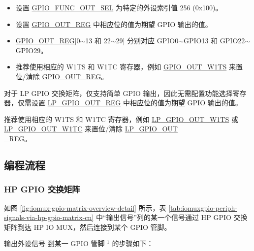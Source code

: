 \documentclass[main\_\_CN.tex]{subfiles}
\begin{document}
\begin{itemize}
    \item 设置 \hyperref[fielddesc:GPIOFUNCNOUTSEL]{GPIO\_FUNC\_OUT\_SEL} 为特定的外设索引值 256 (0x100)。
    \item 设置 \hyperref[regdesc:GPIOOUTREG]{GPIO\_OUT\_REG} 中相应位的值为期望 GPIO 输出的值。
\end{itemize}
\begin{tiplisting}
\vspace{-2em}
\begin{itemize}

\item \hyperref[regdesc:GPIOOUTREG]{GPIO\_OUT\_REG}[0$\sim$13 和 22$\sim$29] 分别对应 GPIO0$\sim$GPIO13 和 GPIO22$\sim$GPIO29。
\item 推荐使用相应的 W1TS 和 W1TC 寄存器，例如 \hyperref[fielddesc:GPIOOUTW1TS]{GPIO\_OUT\_W1TS} 来置位/清除 \hyperref[regdesc:GPIOOUTREG]{GPIO\_OUT\_REG}。
\end{itemize}
\end{tiplisting}
对于 LP GPIO 交换矩阵，仅支持简单 GPIO 输出，因此无需配置功能选择寄存器，仅需设置 \hyperref[regdesc:LPGPIOOUTREG]{LP\_GPIO\_OUT\_REG} 中相应位的值为期望 GPIO 输出的值。

\begin{tiplisting}
推荐使用相应的 W1TS 和 W1TC 寄存器，例如 \hyperref[fielddesc:LPGPIOOUTW1TS]{LP\_GPIO\_OUT\_W1TS} 或 \hyperref[fielddesc:LPGPIOOUTW1TC]{LP\_GPIO\_OUT\_W1TC} 来置位/清除 \hyperref[regdesc:LPGPIOOUTREG]{LP\_GPIO\_OUT\\\_REG}。
\end{tiplisting}

\subsection{编程流程}

\subsubsection{HP GPIO 交换矩阵}
\label{sec:prgramming-procedure-for-hp-output}
如图 \ref{fig:iomux-gpio-matrix-overview-detail} 所示，表 \ref{tab:iomuxgpio-periph-signals-via-hp-gpio-matrix-cn} 中“输出信号”列的某一个信号通过 HP GPIO 交换矩阵到达 HP IO MUX，然后连接到某个 GPIO 管脚。

输出外设信号  到某一 GPIO 管脚 \hyperref[output-note-1]{$^1$} 的步骤如下：
\end{document}
